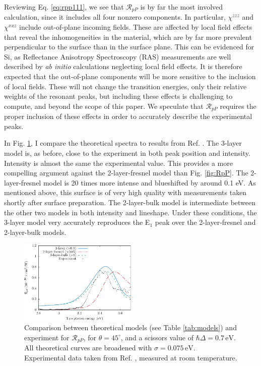 Reviewing Eq. \eqref{eq:rpp111}, we see that $\mathcal{R}_{pP}$ is by far the most involved calculation, since it includes all four nonzero components. In particular, $\chi^{zzz}$ and $\chi^{xxz}$ include out-of-plane incoming fields. These are affected by local field effects\cite{tancognedejean:tel-01235611} that reveal the inhomogeneities in the material, which are by far more prevalent perpendicular to the surface than in the surface plane. This can be evidenced for Si, as Reflectance Anisotropy Spectroscopy (RAS) measurements are well described by \emph{ab initio} calculations neglecting local field effects.\cite{palummoPRB99, gaalPRB09} It is therefore expected that the out-of-plane components will be more sensitive to the inclusion of local fields. These will not change the transition energies, only their relative weights of the resonant peaks,\cite{tancognedejean:tel-01235611} but including these effects is challenging to compute,\cite{nicolasPRB15} and beyond the scope of this paper. We speculate that $\mathcal{R}_{pP}$ requires the proper inclusion of these effects in order to accurately describe the experimental peaks.

In Fig. \ref{fig:mitchellRpP}, I compare the theoretical spectra to results from Ref. \cite{mitchellSS01}. The 3-layer model is, as before, close to the experiment in both peak position and intensity. Intensity is almost the same the experimental value. This provides a more compelling argument against the 2-layer-fresnel model than Fig. \ref{fig:RpP}. The 2-layer-fresnel model is 20 times more intense and blueshifted by around 0.1 eV. As mentioned above, this surface is of very high quality with measurements taken shortly after surface preparation. The 2-layer-bulk model is intermediate between the other two models in both intensity and lineshape. Under these conditions, the 3-layer model very accurately reproduces the E$_{1}$ peak over the 2-layer-fresnel and 2-layer-bulk models.

\begin{figure}[H]
\centering
\includegraphics[width=0.5\textwidth]{content/figures/fig-Si1x1-Mitchell_RpP}
\caption{Comparison between theoretical models (see Table \ref{tab:models}) and experiment for $\mathcal{R}_{pP}$, for $\theta=45^{\circ}$, and a scissors value of $\hbar\Delta = 0.7\,\text{eV}$. All theoretical curves are broadened with $\sigma=0.075\,\text{eV}$. Experimental data taken from Ref. \cite{mitchellSS01}, measured at room temperature.}
\label{fig:mitchellRpP}
\end{figure}


